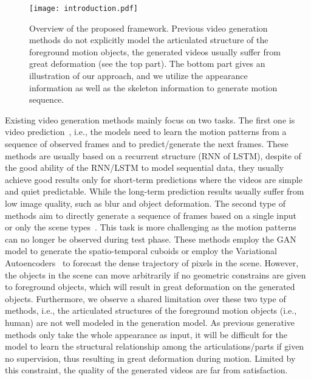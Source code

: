 \documentclass[journal]{IEEEtran}
\begin{document}
\begin{figure}
\texttt{[image: introduction.pdf]}
\caption{Overview of the proposed framework. Previous video generation methods do not explicitly model the articulated structure of the foreground motion objects, the generated videos usually suffer from great deformation (see the top part). The bottom part gives an illustration of our approach, and we utilize the appearance information as well as the skeleton information to generate motion sequence.  }
\end{figure}

Existing video generation methods mainly focus on two tasks.
The first one is video prediction~\cite{DBLP:conf/nips/OhGLLS15,DBLP:conf/icml/SrivastavaMS15,DBLP:journals/corr/LotterKC16,DBLP:journals/corr/MathieuCL15,DBLP:journals/corr/AmersfoortKRSTC17,DBLP:journals/corr/RanzatoSBMCC14}, i.e., the models need to learn the motion patterns from a sequence of observed frames and to predict/generate the next frames. These methods are usually based on a recurrent structure (RNN of LSTM), despite of the good ability of the RNN/LSTM to model sequential data, they usually achieve good results only for short-term predictions where the videos are simple and quiet predictable. While the long-term prediction results usually suffer from low image quality, such as blur and object deformation.
The second type of methods aim to directly generate a sequence of frames based on a single input~\cite{DBLP:conf/eccv/WalkerDGH16} or only the scene types~\cite{DBLP:conf/nips/VondrickPT16}.
This task is more challenging as the motion patterns can no longer be observed during test phase.
These methods employ the GAN model to generate the spatio-temporal cuboids or employ the Variational Autoencoders~\cite{DBLP:journals/corr/KingmaW13} to forecast the dense trajectory of pixels in the scene.
However, the objects in the scene can move arbitrarily if no geometric constrains are given to foreground objects, which will result in great deformation on the generated objects.
Furthermore, we observe a shared limitation over these two type of methods, i.e., the articulated structures of the foreground motion objects (i.e., human) are not well modeled in the generation model. As previous generative methods only take the whole appearance as input, it will be difficult for the model to learn the structural relationship among the articulations/parts if given no supervision, thus resulting in great deformation during motion.
Limited by this constraint, the quality of the generated videos are far from satisfaction.
\end{document}
